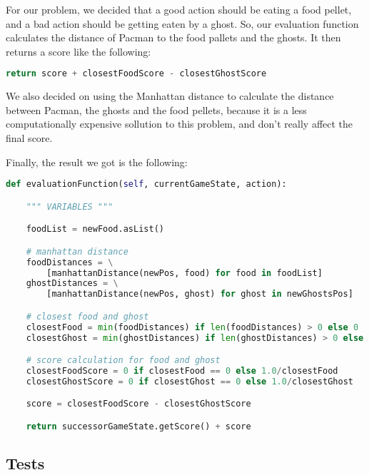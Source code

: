 \documentclass{article}
\begin{document}
For our problem, we decided that a good action should be eating a food pellet, and a bad action should be getting eaten by a ghost. So, our evaluation function calculates the distance of Pacman to the food pallets and the ghosts. It then returns a score like the following:

\hbox{}

\begin{lstlisting}[language=python]
    return score + closestFoodScore - closestGhostScore
\end{lstlisting}

\hbox{}

We also decided on using the Manhattan distance to calculate the distance between Pacman, the ghosts and the food pellets, because it is a less computationally expensive sollution to this problem, and don't really affect the final score.

\hbox{}

Finally, the result we got is the following:

\hbox{}

\begin{lstlisting}[language=python, frame=tlbr, framesep=6pt, backgroundcolor=\color{light-gray}]
def evaluationFunction(self, currentGameState, action):

    """ VARIABLES """

    foodList = newFood.asList()

    # manhattan distance
    foodDistances = \
        [manhattanDistance(newPos, food) for food in foodList]
    ghostDistances = \
        [manhattanDistance(newPos, ghost) for ghost in newGhostsPos]

    # closest food and ghost
    closestFood = min(foodDistances) if len(foodDistances) > 0 else 0
    closestGhost = min(ghostDistances) if len(ghostDistances) > 0 else 0

    # score calculation for food and ghost
    closestFoodScore = 0 if closestFood == 0 else 1.0/closestFood
    closestGhostScore = 0 if closestGhost == 0 else 1.0/closestGhost

    score = closestFoodScore - closestGhostScore

    return successorGameState.getScore() + score
\end{lstlisting}

\subsection{Tests}
\end{document}
